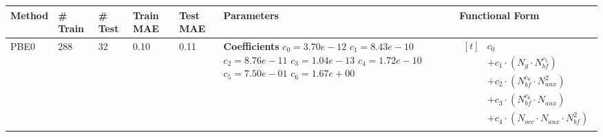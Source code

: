 \small
\setlength{\tabcolsep}{2pt}
\begin{longtable}{|p{1.7cm}|p{1.2cm}|p{1.1cm}|p{1.4cm}|p{1.3cm}|p{6.6cm}|p{4.8cm}|}
\hline
\textbf{Method} & \textbf{\# Train} & \textbf{\# Test} & \textbf{Train MAE} & \textbf{Test MAE} & \textbf{Parameters} & \textbf{Functional Form} \\ 
\hline
\endhead
PBE0 & 288 & 32 & 0.10 & 0.11 & \parbox[t]{\linewidth}{\raggedright\noindent \textbf{Coefficients} \\ \(c_{0}=3.70e-12\) \\ \(c_{1}=8.43e-10\) \\ \(c_{2}=8.76e-11\) \\ \(c_{3}=1.04e-13\) \\ \(c_{4}=1.72e-10\) \\ \(c_{5}=7.50e-01\) \\ \(c_{6}=1.67e+00\)} & \parbox[t]{4.8cm}{\raggedright$\begin{aligned}[t]
& c_{0} \\ & + c_{1}  \cdot  (N_{g}  \cdot  N_{bf} ^{c_{5}}) \\ & + c_{2}  \cdot  (N_{bf} ^{c_{6}}  \cdot  N_{aux}^{2}) \\ & + c_{3}  \cdot  (N_{bf} ^{c_{6}}  \cdot  N_{aux}) \\ & + c_{4}  \cdot  (N_{occ}  \cdot  N_{aux}  \cdot  N_{bf} ^{2})
\end{aligned}$} \\ 
\hline
\end{longtable}
